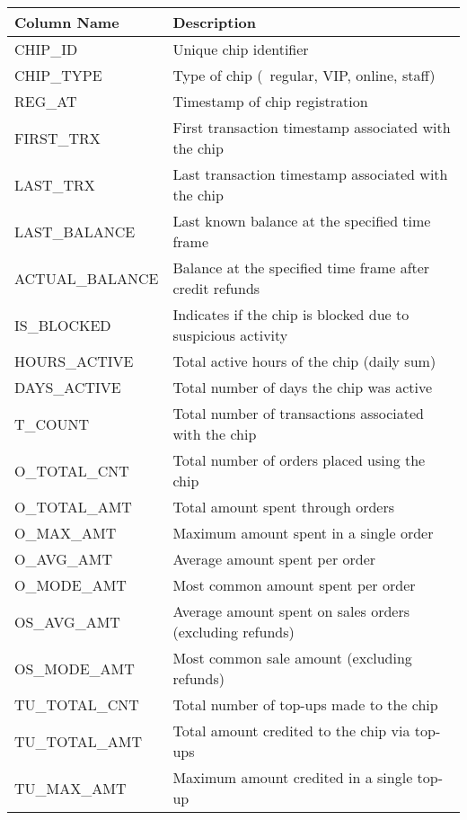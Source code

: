 \begin{table}[h]
	\centering
	\footnotesize
	\begin{tabularx}{\textwidth}{|>{\columncolor{unicorn_blue!5}}X|>{\columncolor{unicorn_blue!5}}l|}
		\hline
		\rowcolor{unicorn_blue}
		\textbf{\color{white} Column Name} & \textbf{\color{white} Description} \\
		\hline
		\hline
		CHIP\_ID & Unique chip identifier \\
		CHIP\_TYPE & Type of chip (\eg~regular, VIP, online, staff) \\
		REG\_AT & Timestamp of chip registration \\
		FIRST\_TRX & First transaction timestamp associated with the chip \\
		LAST\_TRX & Last transaction timestamp associated with the chip \\
		LAST\_BALANCE & Last known balance at the specified time frame \\
		ACTUAL\_BALANCE & Balance at the specified time frame after credit refunds \\
		\hline
		IS\_BLOCKED & Indicates if the chip is blocked due to suspicious activity \\
		HOURS\_ACTIVE & Total active hours of the chip (daily sum) \\
		DAYS\_ACTIVE & Total number of days the chip was active \\
		\hline
		T\_COUNT & Total number of transactions associated with the chip \\
		O\_TOTAL\_CNT & Total number of orders placed using the chip \\
		O\_TOTAL\_AMT & Total amount spent through orders \\
		O\_MAX\_AMT & Maximum amount spent in a single order \\
		O\_AVG\_AMT & Average amount spent per order \\
		O\_MODE\_AMT & Most common amount spent per order \\
		OS\_AVG\_AMT & Average amount spent on sales orders (excluding refunds) \\
		OS\_MODE\_AMT & Most common sale amount (excluding refunds) \\
		TU\_TOTAL\_CNT & Total number of top-ups made to the chip \\
		TU\_TOTAL\_AMT & Total amount credited to the chip via top-ups \\
		TU\_MAX\_AMT & Maximum amount credited in a single top-up \\

\end{tabularx}
\end{table}
